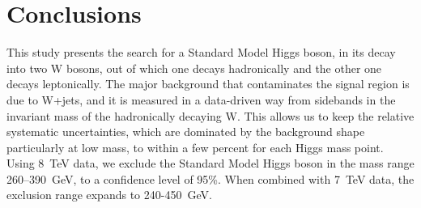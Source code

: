 \section{Conclusions}
\label{sec:conclusions}

This study presents the search for a Standard Model Higgs boson, 
in its decay into two W bosons, 
out of which one decays hadronically and the other one decays leptonically.
The major background that contaminates the signal region is due to W+jets, 
and it is measured in a data-driven way from sidebands in the invariant mass
of the hadronically decaying W.
This allows us to keep the relative systematic uncertainties, 
which are dominated by the background shape particularly at low mass, to within
a few percent for each Higgs mass point. 
Using 8~TeV data, we exclude the Standard Model 
Higgs boson in the mass range 260--390~GeV, to a confidence level
of 95\%. When combined with 7~TeV data, the exclusion range expands to 240-450~GeV.
